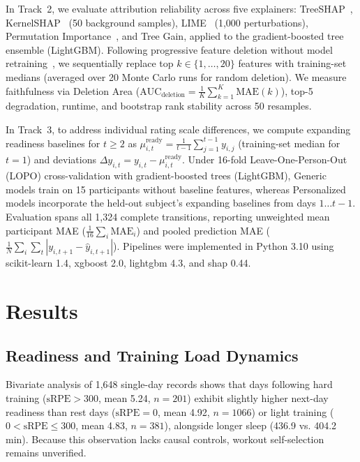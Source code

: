 \documentclass[runningheads]{llncs}
\begin{document}
In Track~2, we evaluate attribution reliability across five explainers: TreeSHAP~\cite{lundberg2020trees}, KernelSHAP~\cite{lundberg2017} (50 background samples), LIME~\cite{ribeiro2016} (1,000 perturbations), Permutation Importance~\cite{breiman2001}, and Tree Gain, applied to the gradient-boosted tree ensemble (LightGBM). Following progressive feature deletion without model retraining~\cite{hooker2019}, we sequentially replace top $k \in \{1, \dots, 20\}$ features with training-set medians (averaged over 20 Monte Carlo runs for random deletion). We measure faithfulness via Deletion Area ($\mathrm{AUC}_{\text{deletion}} = \frac{1}{K}\sum_{k=1}^K \mathrm{MAE}(k)$), top-5 degradation, runtime, and bootstrap rank stability across 50 resamples.

In Track~3, to address individual rating scale differences, we compute expanding readiness baselines for $t \geq 2$ as $\mu_{i,t}^{\text{ready}} = \frac{1}{t-1} \sum_{j=1}^{t-1} y_{i,j}$ (training-set median for $t=1$) and deviations $\Delta y_{i,t} = y_{i,t} - \mu_{i,t}^{\text{ready}}$. Under 16-fold Leave-One-Person-Out (LOPO) cross-validation with gradient-boosted trees (LightGBM), Generic models train on 15 participants without baseline features, whereas Personalized models incorporate the held-out subject's expanding baselines from days $1 \dots t-1$. Evaluation spans all 1,324 complete transitions, reporting unweighted mean participant MAE ($\frac{1}{16}\sum_i \text{MAE}_i$) and pooled prediction MAE ($\frac{1}{N}\sum_i \sum_t |y_{i,t+1} - \widehat{y}_{i,t+1}|$). Pipelines were implemented in Python 3.10 using scikit-learn 1.4, xgboost 2.0, lightgbm 4.3, and shap 0.44.

\section{Results}

\subsection{Readiness and Training Load Dynamics}
Bivariate analysis of 1,648 single-day records shows that days following hard training ($\text{sRPE} > 300$, mean 5.24, $n=201$) exhibit slightly higher next-day readiness than rest days ($\text{sRPE} = 0$, mean 4.92, $n=1066$) or light training ($0 < \text{sRPE} \leq 300$, mean 4.83, $n=381$), alongside longer sleep (436.9 vs. 404.2 min). Because this observation lacks causal controls, workout self-selection remains unverified.
\end{document}
